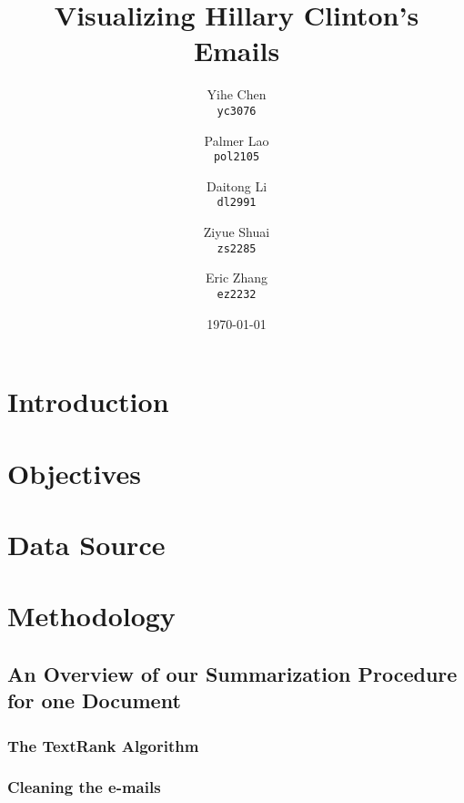 \documentclass[11pt]{article}
\begin{document}
\title{Visualizing Hillary Clinton's Emails}

\author{
  Yihe Chen \\
  \texttt{yc3076}
  \and 
  Palmer Lao \\
  \texttt{pol2105}
  \and
  Daitong Li \\
  \texttt{dl2991}
  \and
  Ziyue Shuai \\
  \texttt{zs2285}
  \and
  Eric Zhang \\ 
  \texttt{ez2232}
}

\date{\today}
\maketitle
\doublespacing


\section{Introduction}


\section{Objectives}


\section{Data Source}

%

\section{Methodology}

\subsection{An Overview of our Summarization Procedure for one Document}


\subsubsection{The TextRank Algorithm}


\subsubsection{Cleaning the e-mails}

\end{document}
